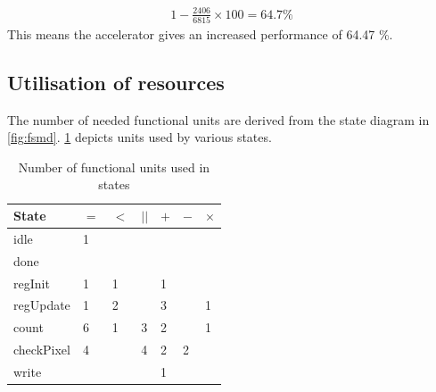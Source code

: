 \documentclass[a4paper, english]{article}
\numberwithin{equation}{section}
\begin{document}
\begin{align}
    1 - \frac{2406}{6815} \times 100 = 64.7 \% \label{eq:increase}
\end{align}\newline
This means the accelerator gives an increased performance of 64.47 \%.

\subsection{Utilisation of resources}
The number of needed functional units are derived from the state diagram in \cref{fig:fsmd}. \cref{tbl:funcunits} depicts units used by various states.
\begin{table}[H]
    \centering
    \caption{Number of functional units used in states}\label{tbl:funcunits}
    \begin{tabular}{lllllll}
        \toprule
        State      & \(=\) & \(<\) & \(||\) & \(+\) & \(-\) & \(\times\) \\
        \midrule
        idle       & 1     &       &        &       &       &            \\
        done       &       &       &        &       &       &            \\
        regInit    & 1     & 1     &        & 1     &       &            \\
        regUpdate  & 1     & 2     &        & 3     &       & 1          \\
        count      & 6     & 1     & 3      & 2     &       & 1          \\
        checkPixel & 4     &       & 4      & 2     & 2     &            \\
        write      &       &       &        & 1     &       &            \\
        \bottomrule
    \end{tabular}
\end{table}
\end{document}
